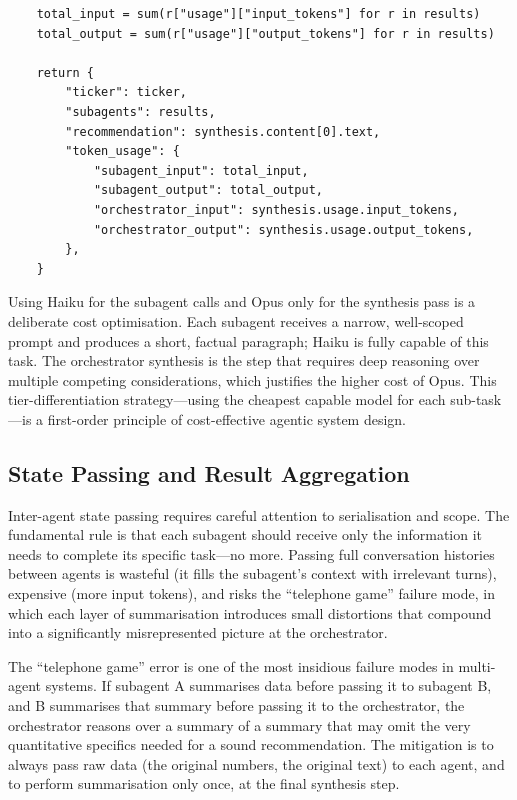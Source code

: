 \begin{verbatim}
    total_input = sum(r["usage"]["input_tokens"] for r in results)
    total_output = sum(r["usage"]["output_tokens"] for r in results)

    return {
        "ticker": ticker,
        "subagents": results,
        "recommendation": synthesis.content[0].text,
        "token_usage": {
            "subagent_input": total_input,
            "subagent_output": total_output,
            "orchestrator_input": synthesis.usage.input_tokens,
            "orchestrator_output": synthesis.usage.output_tokens,
        },
    }
\end{verbatim}

Using Haiku for the subagent calls and Opus only for the synthesis pass is a deliberate
cost optimisation. Each subagent receives a narrow, well-scoped prompt and produces a
short, factual paragraph; Haiku is fully capable of this task. The orchestrator
synthesis is the step that requires deep reasoning over multiple competing
considerations, which justifies the higher cost of Opus. This tier-differentiation
strategy---using the cheapest capable model for each sub-task---is a first-order
principle of cost-effective agentic system design.

\subsection{State Passing and Result Aggregation}
\label{app:sdk-commercial:workflows:state}

Inter-agent state passing requires careful attention to serialisation and scope. The
fundamental rule is that each subagent should receive only the information it needs to
complete its specific task---no more. Passing full conversation histories between agents
is wasteful (it fills the subagent's context with irrelevant turns), expensive (more
input tokens), and risks the ``telephone game'' failure mode, in which each layer of
summarisation introduces small distortions that compound into a significantly
misrepresented picture at the orchestrator.

\begin{remark}
\label{rem:telephone-game}
The ``telephone game'' error is one of the most insidious failure modes in multi-agent
systems. If subagent A summarises data before passing it to subagent B, and B
summarises that summary before passing it to the orchestrator, the orchestrator reasons
over a summary of a summary that may omit the very quantitative specifics needed for
a sound recommendation. The mitigation is to always pass raw data (the original numbers,
the original text) to each agent, and to perform summarisation only once, at the final
synthesis step.
\end{remark}

